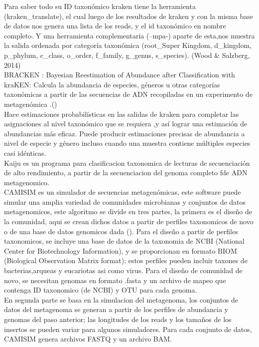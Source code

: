 Para saber todo su ID taxonómico kraken tiene la herramienta (kraken\_translate), el cual luego de los resultados de kraken y con la misma base de datos nos genera una lista de los reads, y el id taxonómico en nombre completo. Y una herramienta complementaria (--mpa-) aparte de esta,nos muestra la salida ordenada por categoría taxonómica (root\_Super Kingdom, d\_kingdom, p\_phylum, c\_class, o\_order, f\_family, g\_genus, s\_species). (Wood \& Salzberg, 2014)  \\

BRACKEN : Bayesian Reestimation of Abundance after Classification with kraKEN: Calcula la abundancia de especies, géneros u otras categorías taxonómicas a partir de las secuencias de ADN recopiladas en un experimento de metagenómica .(\cite{lu2017bracken})  \\

Hace estimaciones probabilísticas en las salidas de kraken para completar las asignaciones al nivel taxonómico que se requiera ,y así lograr una estimación de abundancias más eficaz. Puede producir estimaciones precisas de abundancia a nivel de especie y género incluso cuando una muestra contiene múltiples especies casi idénticas.   \\


Kaiju es un programa para clasificacion taxonomica de lecturas de secuenciación de alto rendimiento,  a partir de la secuenciacion del genoma completo fde ADN metagenomico.  \\

CAMISIM es un simulador de secuencias metagenómicas, este software puede simular una amplia variedad de comunidades microbianas y conjuntos de datos metagenomicos, este algoritmo se divide en tres partes, la primera es el diseño de la comunidad, aqui se crean dichos datos a partir de perfiles taxonomicos de novo o de una base de datos genomicos dada (\cite{fritz2019camisim}). Para el diseño a partir de perfiles taxonomicos, se incluye una base de datos de la taxonomia de NCBI (National Center for Biotechnology Information), y se proporcionan en formato BIOM (Biological Observation Matrix format); estos perfiles pueden incluir taxones de bacterias,arqueas y eucariotas asi como virus. Para el diseño de comunidad de novo, se necesitan genomas en formato .fasta y un archivo de mapeo que contenga ID taxonomico (de NCBI) y OTU para cada genoma.  \\

En segunda parte se basa en la simulacion del metagenoma, los conjuntos de datos del metagenoma se generan a partir de los perfiles de abundancia y genomas del paso anterior; las longitudes de los reads y los tamaños de los insertos se pueden variar para algunos simuladores. Para cada conjunto de datos, CAMISIM genera archivos FASTQ y un archivo BAM.  \\

